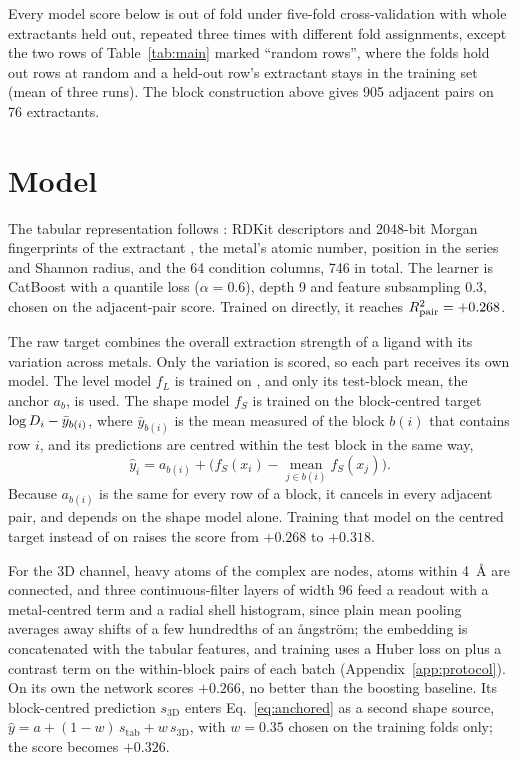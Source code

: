 Every model score below is out of fold under five-fold cross-validation with whole extractants held out, repeated three times with different fold assignments, except the two rows of Table~\ref{tab:main} marked ``random rows'', where the folds hold out rows at random and a held-out row's extractant stays in the training set (mean of three runs). The block construction above gives 905 adjacent pairs on 76 extractants.

\section{Model}
\label{sec:model}
The tabular representation follows \citet{liu2022}: RDKit descriptors and 2048-bit Morgan fingerprints of the extractant \citep{rogers2010}, the metal's atomic number, position in the series and Shannon radius, and the 64 condition columns, 746 in total. The learner is CatBoost \citep{catboost2018} with a quantile loss ($\alpha = 0.6$), depth 9 and feature subsampling 0.3, chosen on the adjacent-pair score. Trained on \logD{} directly, it reaches $R^2_{\mathrm{pair}} = +0.268$.

The raw target combines the overall extraction strength of a ligand with its variation across metals. Only the variation is scored, so each part receives its own model. The level model $f_L$ is trained on \logD{}, and only its test-block mean, the anchor $a_b$, is used. The shape model $f_S$ is trained on the block-centred target $\log D_i - \bar y_{b(i)}$, where $\bar y_{b(i)}$ is the mean measured \logD{} of the block $b(i)$ that contains row $i$, and its predictions are centred within the test block in the same way,
\begin{equation}
  \hat y_i = a_{b(i)} + \Big(f_S(x_i) - \operatorname*{mean}_{j \in b(i)} f_S(x_j)\Big).
  \label{eq:anchored}
\end{equation}
Because $a_{b(i)}$ is the same for every row of a block, it cancels in every adjacent pair, and \adjR{} depends on the shape model alone. Training that model on the centred target instead of on \logD{} raises the score from $+0.268$ to $+0.318$.

For the 3D channel, heavy atoms of the complex are nodes, atoms within 4~\AA{} are connected, and three continuous-filter layers of width 96 \citep{schnet2017} feed a readout with a metal-centred term and a radial shell histogram, since plain mean pooling averages away shifts of a few hundredths of an \aa ngstr\"om; the embedding is concatenated with the tabular features, and training uses a Huber loss on \logD{} plus a contrast term on the within-block pairs of each batch (Appendix~\ref{app:protocol}). On its own the network scores $+0.266$, no better than the boosting baseline. Its block-centred prediction $s_{\mathrm{3D}}$ enters Eq.~\eqref{eq:anchored} as a second shape source, $\hat y = a + (1-w)\,s_{\mathrm{tab}} + w\,s_{\mathrm{3D}}$, with $w = 0.35$ chosen on the training folds only; the score becomes $+0.326$.

